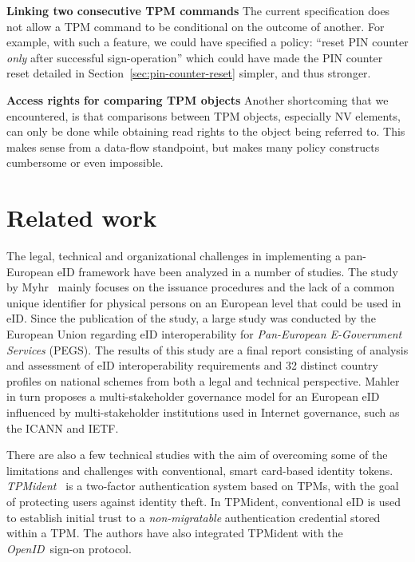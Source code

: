 \documentclass{sig-alternate-2013}
\begin{document}
\noindent\textbf{Linking two consecutive TPM commands} The current specification
does not allow a TPM command to be conditional on the outcome of another.  For
example, with such a feature, we could have specified a policy: ``reset PIN
counter \emph{only} after successful sign-operation'' which could have made the
PIN counter reset detailed in Section~\ref{sec:pin-counter-reset} simpler, and
thus stronger.

\noindent\textbf{Access rights for comparing TPM objects} Another shortcoming
that we encountered, is that comparisons between TPM objects, especially NV
elements, can only be done while obtaining read rights to the object being
referred to. This makes sense from a data-flow standpoint, but makes many policy
constructs cumbersome or even impossible. 

 
\section{Related work}
\label{sec:related-work}

The legal, technical and organizational challenges in implementing a pan-European
eID framework have been analyzed in a number of studies. The study by
Myhr~\cite{Myhr08} mainly focuses on the issuance procedures and the lack of a
common unique identifier for physical persons on an European level that could be
used in eID. Since the publication of the study, a large study was conducted by
the European Union regarding eID interoperability for \emph{Pan-European
E-Government Services} (PEGS)\footnotemark. The results of this study are a
final report consisting of analysis and assessment of eID interoperability
requirements and 32 distinct country profiles on national schemes from both a
legal and technical perspective. Mahler~\cite{Mahler13} in turn proposes a
multi-stakeholder governance model for an European eID influenced by
multi-stakeholder institutions used in Internet governance, such as the ICANN
and IETF\@.


There are also a few technical studies with the aim of overcoming some of the
limitations and challenges with conventional, smart card-based identity tokens.
\emph{TPMident}~\cite{Klenk09} is a two-factor authentication system based on
TPMs, with the goal of protecting users against identity theft. In TPMident,
conventional eID is used to establish initial trust to a \emph{non-migratable}
authentication credential stored within a TPM\@. The authors have also
integrated TPMident with the \emph{OpenID}\footnotemark\ sign-on protocol.
\end{document}
